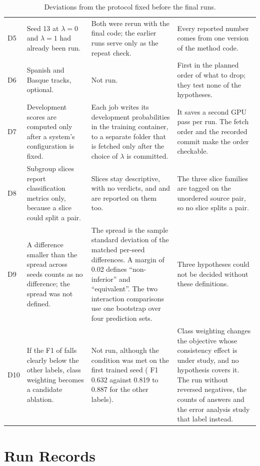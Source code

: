 \begin{table}[t]
\begin{tabular}{@{}N{0.03\textwidth}L{0.24\textwidth}L{0.31\textwidth}L{0.34\textwidth}@{}}
\addlinespace
D5 & Seed 13 at $\lambda = 0$ and $\lambda = 1$ had already been run. & Both were rerun with the final code; the earlier runs serve only as the repeat check. & Every reported number comes from one version of the method code. \\
\addlinespace
D6 & Spanish and Basque tracks, optional. & Not run. & First in the planned order of what to drop; they test none of the hypotheses. \\
\addlinespace
D7 & Development scores are computed only after a system's configuration is fixed. & Each job writes its development probabilities in the training container, to a separate folder that is fetched only after the choice of $\lambda$ is committed. & It saves a second GPU pass per run. The fetch order and the recorded commit make the order checkable. \\
\addlinespace
D8 & Subgroup slices report classification metrics only, because a slice could split a pair. & Slices stay descriptive, with no verdicts, and \SoftCons{} and \HardCons{} are reported on them too. & The three slice families are tagged on the unordered source pair, so no slice splits a pair. \\
\addlinespace
D9 & A difference smaller than the spread across seeds counts as no difference; the spread was not defined. & The spread is the sample standard deviation of the matched per-seed differences. A margin of 0.02 defines ``non-inferior'' and ``equivalent''. The two interaction comparisons use one bootstrap over four prediction sets. & Three hypotheses could not be decided without these definitions. \\
\addlinespace
D10 & If the F1 of \NO{} falls clearly below the other labels, class weighting becomes a candidate ablation. & Not run, although the condition was met on the first trained seed (\NO{} F1 0.632 against 0.819 to 0.887 for the other labels). & Class weighting changes the objective whose consistency effect is under study, and no hypothesis covers it. The run without reversed negatives, the counts of \NO{} answers and the error analysis study that label instead. \\
\bottomrule
\end{tabular}
\caption{Deviations from the protocol fixed before the final runs.}
\label{tab:deviations}
\end{table}

\section{Run Records}
\label{app:runs}

